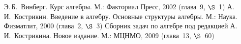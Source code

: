 \documentclass[a4paper,10pt]{amsart}
\def\ZZ{{\mathbb Z}}%
\def\NN{{\mathbb N}}%
\newtheorem{proposition}{Предложение}
\newtheorem{corollary}{Следствие}
\theoremstyle{definition}
\newtheorem{definition}{Определение}
\theoremstyle{remark}
\newtheorem{remark}{Замечание}
\begin{document}
%
%
%
%
%
%

\bigskip

\begin{thebibliography}{99}
Э.\,Б.~Винберг. Курс алгебры. М.: Факториал Пресс, 2002 (глава~9,
$\S$~1)
А.\,И.~Кострикин. Введение в алгебру. Основные структуры алгебры.
М.: Наука. Физматлит, 2000 (глава~2, $\S$~3)
Сборник задач по алгебре под редакцией А.\,И.~Кострикина. Новое
издание. М.: МЦНМО, 2009 (глава~13, $\S$~60)
\end{thebibliography}
\end{document}
